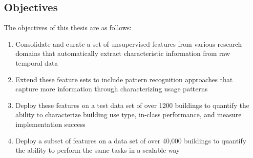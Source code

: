 \subsection{Objectives}
The objectives of this thesis are as follows:
\begin{enumerate}
\item Consolidate and curate a set of unsupervised features from various research domains that automatically extract characteristic information from raw temporal data
\item Extend these feature sets to include pattern recognition approaches that capture more information through characterizing usage patterns
\item Deploy these features on a test data set of over 1200 buildings to quantify the ability to characterize building use type, in-class performance, and measure implementation success
\item Deploy a subset of features on a data set of over 40,000 buildings to quantify the ability to perform the same tasks in a scalable way
\end{enumerate}